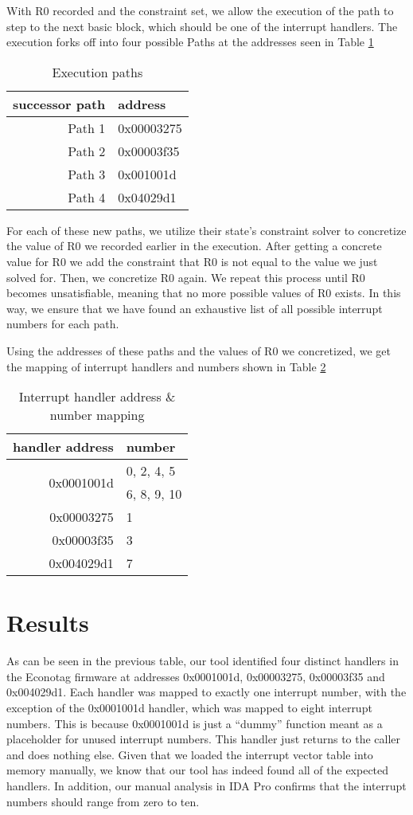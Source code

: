 \documentclass[letterpaper, 10 pt, conference]{ieeeconf}
\begin{document}
With R0 recorded and the constraint set, we allow the execution of the path to step to the next basic block, which should be one of the interrupt handlers. The execution forks off into four possible Paths at the addresses seen in Table \ref{table:paths}

\begin{table}[h]
\centering
\begin{tabular}{r|l}
successor path & address \\ \hline
Path 1 & 0x00003275 \\
Path 2 & 0x00003f35 \\
Path 3 & 0x001001d \\
Path 4 & 0x04029d1 \\
\end{tabular}
\caption{Execution paths}
\label{table:paths}
\end{table}

For each of these new paths, we utilize their state’s constraint solver to concretize the value of R0 we recorded earlier in the execution. After getting a concrete value for R0 we add the constraint that R0 is not equal to the value we just solved for. Then, we concretize R0 again. We repeat this process until R0 becomes unsatisfiable, meaning that no more possible values of R0 exists. In this way, we ensure that we have found an exhaustive list of all possible interrupt numbers for each path. 

Using the addresses of these paths and the values of R0 we concretized, we get the mapping of interrupt handlers and numbers shown in Table \ref{table:results}

\begin{table}[h]
\centering
\begin{tabular}{r|l}
handler address & number \\ \hline
\multirow{2}{*}{0x0001001d} & 0, 2, 4, 5 \\ & 6, 8, 9, 10 \\
0x00003275 & 1 \\
0x00003f35& 3 \\
0x004029d1 & 7 \\
\end{tabular}
\caption{Interrupt handler address \& number mapping}
\label{table:results}
\end{table}

\section{Results} \label{results}
As can be seen in the previous table, our tool identified four distinct handlers in the Econotag firmware at addresses 0x0001001d, 0x00003275, 0x00003f35 and 0x004029d1. Each handler was mapped to exactly one interrupt number, with the exception of the 0x0001001d handler, which was mapped to eight interrupt numbers. This is because 0x0001001d is just a “dummy” function meant as a placeholder for unused interrupt numbers. This handler just returns to the caller and does nothing else. Given that we loaded the interrupt vector table into memory manually, we know that our tool has indeed found all of the expected handlers. In addition, our manual analysis in IDA Pro confirms that the interrupt numbers should range from zero to ten.
\end{document}
